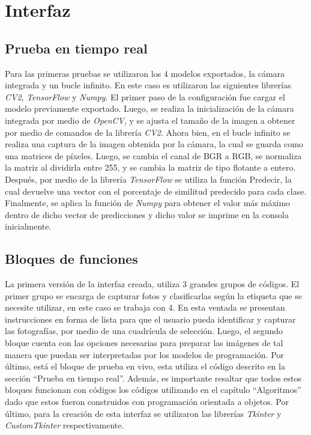 \section{Interfaz}

\subsection{Prueba en tiempo real}
Para las primeras pruebas se utilizaron los 4 modelos exportados, la cámara integrada y un bucle infinito. En este caso es utilizaron las siguientes librerías \textit{CV2}, \textit{TensorFlow} y \textit{Numpy}. El primer paso de la configuración fue cargar el modelo previamente exportado. Luego, se realiza la inicialización de la cámara integrada por medio de \textit{OpenCV}, y se ajusta el tamaño de la imagen a obtener por medio de comandos de la librería \textit{CV2}. 
Ahora bien, en el bucle infinito se realiza una captura de la imagen obtenida por la cámara, la cual se guarda como una matrices de píxeles. Luego, se cambia el canal de BGR a RGB, se normaliza la matriz al dividirla entre 255, y se cambia la matriz de tipo flotante a entero. Después, por medio de la librería \textit{TensorFlow} se utiliza la función Predecir, la cual devuelve una vector con el porcentaje de similitud predecido para cada clase. Finalmente, se aplica la función de \textit{Numpy} para obtener el valor más máximo dentro de dicho vector de predicciones y dicho valor se imprime en la consola inicialmente.

\subsection{Bloques de funciones}
La primera versión de la interfaz creada, utiliza 3 grandes grupos de códigos. El primer grupo se encarga de capturar fotos y clasificarlas según la etiqueta que se necesite utilizar, en este caso se trabaja con 4. En esta ventada se presentan instrucciones en forma de lista para que el usuario pueda identificar y capturar las fotografías, por medio de una cuadrícula de selección. Luego, el segundo bloque cuenta con las opciones necesarias para preparar las imágenes de tal manera que puedan ser interpretadas por los modelos de programación. Por último, está el bloque de prueba en vivo, esta utiliza el código descrito en la sección ``Prueba en tiempo real''. Además, es importante resaltar que todos estos bloques funcionan con códigos los códigos utilizando en el capítulo ``Algoritmos'' dado que estos fueron construidos con programación orientada a objetos. Por último, para la creación de esta interfaz se utilizaron las librerías \textit{Tkinter} y \textit{CustomTkinter} respectivamente. 

